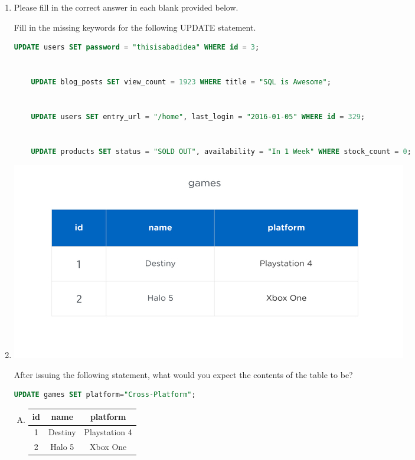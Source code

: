 \documentclass[12pt]{article}
\begin{document}
\begin{enumerate}[1.]
    \item

    Please fill in the correct answer in each blank provided below.

    \bigskip

    Fill in the missing keywords for the following UPDATE statement.

    \bigskip

    \begin{lstlisting}[language=SQL]
    UPDATE users SET password = "thisisabadidea" WHERE id = 3;


    UPDATE blog_posts SET view_count = 1923 WHERE title = "SQL is Awesome";


    UPDATE users SET entry_url = "/home", last_login = "2016-01-05" WHERE id = 329;


    UPDATE products SET status = "SOLD OUT", availability = "In 1 Week" WHERE stock_count = 0;
    \end{lstlisting}


    \item

    \begin{center}
    \includegraphics[width=0.8 \linewidth]{images/part_2_notes_1.png}
    \end{center}

    After issuing the following statement, what would you expect the contents of the table to be?

    \bigskip

    \begin{lstlisting}[language=SQL]
    UPDATE games SET platform="Cross-Platform";
    \end{lstlisting}

    \bigskip

    \begin{enumerate}[A.]
        \item

        \begin{tabular}{|c|c|c|}
        \hline
        id  &	name    &	platform\\
        \hline
        1   &	Destiny &	Playstation 4\\
        \hline
        2   &	Halo 5  &	Xbox One\\
        \hline
        \end{tabular}


\end{enumerate}
\end{enumerate}
\end{document}
